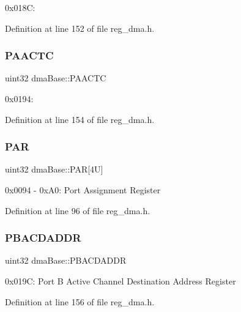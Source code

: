 0x018C\+: 

Definition at line 152 of file reg\+\_\+dma.\+h.

\mbox{\label{structdmaBase_a87e2621af92ef0f7b5e38a16922a55de}} 
\subsubsection{\texorpdfstring{P\+A\+A\+C\+TC}{PAACTC}}
{\footnotesize\ttfamily uint32 dma\+Base\+::\+P\+A\+A\+C\+TC}

0x0194\+: 

Definition at line 154 of file reg\+\_\+dma.\+h.

\mbox{\label{structdmaBase_a735e065c8d40ca7363a065129965b17c}} 
\subsubsection{\texorpdfstring{P\+AR}{PAR}}
{\footnotesize\ttfamily uint32 dma\+Base\+::\+P\+AR\mbox{[}4\+U\mbox{]}}

0x0094 -\/ 0x\+A0\+: Port Assignment Register 

Definition at line 96 of file reg\+\_\+dma.\+h.

\mbox{\label{structdmaBase_aa1564eee99969bd5438fd229c1a8b24a}} 
\subsubsection{\texorpdfstring{P\+B\+A\+C\+D\+A\+D\+DR}{PBACDADDR}}
{\footnotesize\ttfamily uint32 dma\+Base\+::\+P\+B\+A\+C\+D\+A\+D\+DR}

0x019C\+: Port B Active Channel Destination Address Register 

Definition at line 156 of file reg\+\_\+dma.\+h.

\mbox{\label{structdmaBase_a4afdd58f8c93fd0ac00fef817503606b}} 
